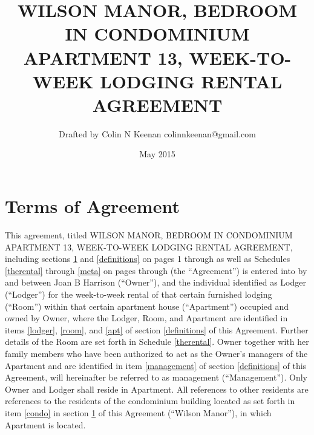 \documentclass[]{article}
\newcommand{\agreementtitle}{WILSON MANOR, BEDROOM IN CONDOMINIUM APARTMENT 13, WEEK-TO-WEEK LODGING RENTAL AGREEMENT}
\newcommand{\agreementdef}{agreement, titled \agreementtitle{}, including sections \ref{specifics} and \ref{definitions} on pages 1 through \pageref{acceptance} as well as Schedules \ref{therental} through \ref{meta} on pages \pageref{therental} through \pageref{LastPage}}
\newcommand{\specifics}{Terms of Agreement}
\newcommand{\mom}{Joan B Harrison}
\newcommand{\management}{Management}
\newcommand{\condo}{Wilson Manor}
\newcommand{\apt}{Apartment}
\newcommand{\room}{Room}
\begin{document}
\title{\agreementtitle{}}
\author{Drafted by Colin N Keenan colinnkeenan@gmail.com}
\date{May 2015}
\maketitle
\thispagestyle{fancy}

\noindent \hrulefill
\section{\specifics{}} \label{specifics}
This \agreementdef{} (the ``Agreement'') is entered into by and between \mom{} (``Owner''), and the individual identified as Lodger (``Lodger'') for the week-to-week rental of that certain furnished lodging (``\room{}'') within that certain apartment house (``\apt{}'') occupied and owned by Owner, where the Lodger, \room{}, and \apt{} are identified in items \ref{lodger}, \ref{room}, and \ref{apt} of section \ref{definitions} of this Agreement. Further details of the \room{} are set forth in Schedule \ref{therental}. Owner together with her family members who have been authorized to act as the Owner's managers of the \apt{} and are identified in item \ref{management} of section \ref{definitions} of this Agreement, will hereinafter be referred to as management (``\management{}''). Only Owner and Lodger shall reside in \apt{}. All references to other residents are references to the residents of the condominium building located as set forth in item \ref{condo} in section \ref{specifics} of this Agreement (``\condo{}''), in which \apt{} is located.
\end{document}
